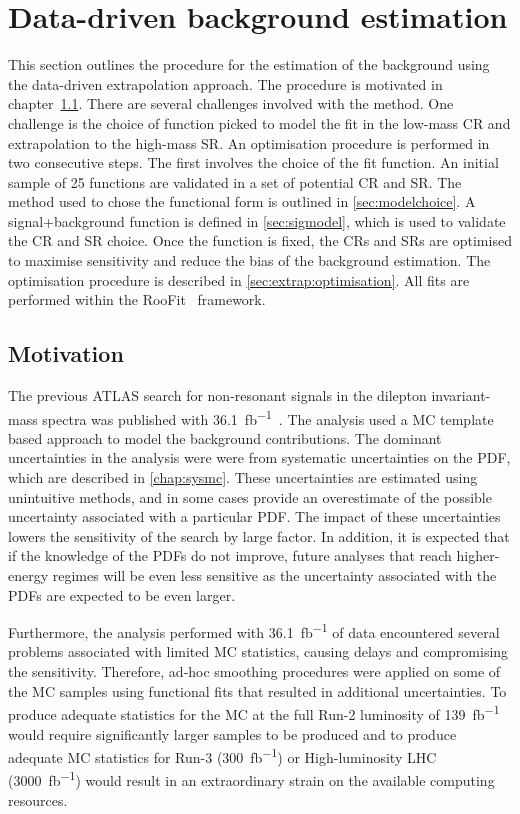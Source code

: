 \chapter{Data-driven background estimation}\label{chap:bkgmodel}
This section outlines the procedure for the estimation of the background using the data-driven extrapolation approach. The procedure is motivated in chapter~\cref{sec:bkgmodel:motivation}. There are several challenges involved with the method. One challenge is the choice of function picked to model the fit in the low-mass CR and extrapolation to the high-mass SR. An optimisation procedure is performed in two consecutive steps. The first involves the choice of the fit function. An initial sample of 25 functions are validated in a set of potential CR and SR. The method used to chose the functional form is outlined in \cref{sec:modelchoice}. A signal+background function is defined in \cref{sec:sigmodel}, which is used to validate the CR and SR choice. Once the function is fixed, the CRs and SRs are optimised to maximise sensitivity and reduce the bias of the background estimation. The optimisation procedure is described in \cref{sec:extrap:optimisation}. All fits are performed within the RooFit~\cite{RooFit} framework.

\section{Motivation}\label{sec:bkgmodel:motivation}
The previous ATLAS search for non-resonant signals in the dilepton invariant-mass spectra was published with \SI{36.1}{\femto\barn^{-1}}~\cite{EXOT-2016-05}. The analysis used a MC template based approach to model the background contributions. The dominant uncertainties in the analysis were were from systematic uncertainties on the PDF, which are described in \cref{chap:sysmc}. These uncertainties are estimated using unintuitive methods, and in some cases provide an overestimate of the possible uncertainty associated with a particular PDF. The impact of these uncertainties lowers the sensitivity of the search by large factor. In addition, it is expected that if the knowledge of the PDFs do not improve, future analyses that reach higher-energy regimes will be even less sensitive as the uncertainty associated with the PDFs are expected to be even larger. 

Furthermore, the analysis performed with \SI{36.1}{\femto\barn^{-1}} of data encountered several problems associated with limited MC statistics, causing delays and compromising the sensitivity. Therefore, ad-hoc smoothing procedures were applied on some of the MC samples using functional fits that resulted in additional uncertainties. To produce adequate statistics for the MC at the full Run-2 luminosity of \SI{139}{\femto\barn^{-1}} would require significantly larger samples to be produced and to produce adequate MC statistics for Run-3 (\SI{300}{\femto\barn^{-1}}) or High-luminosity LHC (\SI{3000}{\femto\barn^{-1}}) would result in an extraordinary strain on the available computing resources. 

